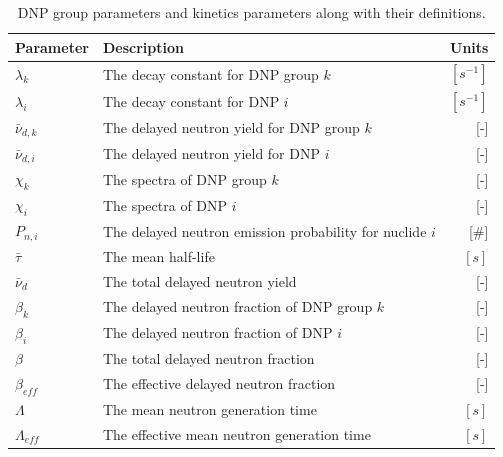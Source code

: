 \begin{table}[H]
    \centering
    \caption{\Gls{DNP} group parameters and kinetics parameters along with their definitions.}
    \begin{tabular}{l l r}
        \hline
        Parameter & Description & Units\\
        \hline
        $\lambda_k$ & The decay constant for \gls{DNP} group $k$ & $[s^{-1}]$\\
        $\lambda_i$ & The decay constant for \gls{DNP} $i$ & $[s^{-1}]$\\
        $\bar{\nu}_{d, k}$ & The delayed neutron yield for \gls{DNP} group $k$ & [-]\\        
        $\bar{\nu}_{d, i}$ & The delayed neutron yield for \gls{DNP} $i$ & [-]\\
        $\chi_k$ & The spectra of \gls{DNP} group $k$& [-]\\
        $\chi_i$ & The spectra of \gls{DNP} $i$ & [-]\\
        $P_{n, i}$ & The delayed neutron emission probability for nuclide $i$ & [$\#$]\\
        $\bar{\tau}$ & The mean half-life & $[s]$\\
        $\bar{\nu}_d$ & The total delayed neutron yield & [-]\\
        \hline
        $\beta_k$ & The delayed neutron fraction of \gls{DNP} group $k$ & [-]\\
        $\beta_i$ & The delayed neutron fraction of \gls{DNP} $i$ & [-]\\
        $\beta$ & The total delayed neutron fraction & [-]\\
        $\beta_{eff}$ & The effective delayed neutron fraction & [-]\\
        $\Lambda$ & The mean neutron generation time & $[s]$\\
        $\Lambda_{eff}$ & The effective mean neutron generation time & $[s]$ \\
        \hline
    \end{tabular}
    \label{tab:dnpgandk}
\end{table}

